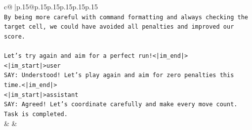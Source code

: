\documentclass{article}
\begin{document}
{\begin{supertabular}{c@{$\;$}|p{.15\linewidth}@{}p{.15\linewidth}p{.15\linewidth}p{.15\linewidth}p{.15\linewidth}p{.15\linewidth}}
{{{\\ 
\texttt{By being more careful with command formatting and always checking the target cell, we could have avoided all penalties and improved our score.} \\
\\ 
\texttt{Let's try again and aim for a perfect run!<|im\_end|>} \\
\texttt{<|im\_start|>user} \\
\texttt{SAY: Understood! Let's play again and aim for zero penalties this time.<|im\_end|>} \\
\texttt{<|im\_start|>assistant} \\
\texttt{SAY: Agreed! Let's coordinate carefully and make every move count. Task is completed.} \\
            }
        }
    }
    & & \\ \\


\end{supertabular}}
\end{document}
